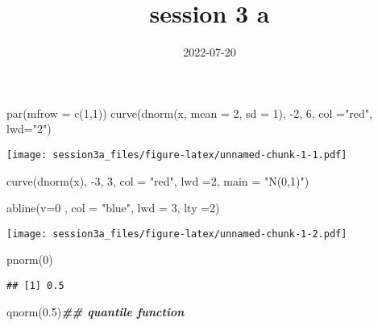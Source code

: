 \documentclass[
]{article}
\title{session 3 a}
\author{}
\date{\vspace{-2.5em}2022-07-20}
\newenvironment{Shaded}{\begin{snugshade}}{\end{snugshade}}
\newcommand{\AttributeTok}[1]{\textcolor[rgb]{0.77,0.63,0.00}{#1}}
\newcommand{\DecValTok}[1]{\textcolor[rgb]{0.00,0.00,0.81}{#1}}
\newcommand{\DocumentationTok}[1]{\textcolor[rgb]{0.56,0.35,0.01}{\textbf{\textit{#1}}}}
\newcommand{\FloatTok}[1]{\textcolor[rgb]{0.00,0.00,0.81}{#1}}
\newcommand{\FunctionTok}[1]{\textcolor[rgb]{0.00,0.00,0.00}{#1}}
\newcommand{\NormalTok}[1]{#1}
\newcommand{\SpecialCharTok}[1]{\textcolor[rgb]{0.00,0.00,0.00}{#1}}
\newcommand{\StringTok}[1]{\textcolor[rgb]{0.31,0.60,0.02}{#1}}
\begin{document}
\maketitle

\begin{Shaded}
\begin{Highlighting}[]
\FunctionTok{par}\NormalTok{(}\AttributeTok{mfrow =} \FunctionTok{c}\NormalTok{(}\DecValTok{1}\NormalTok{,}\DecValTok{1}\NormalTok{))}
\FunctionTok{curve}\NormalTok{(}\FunctionTok{dnorm}\NormalTok{(x, }\AttributeTok{mean =} \DecValTok{2}\NormalTok{, }\AttributeTok{sd =} \DecValTok{1}\NormalTok{), }\SpecialCharTok{{-}}\DecValTok{2}\NormalTok{, }\DecValTok{6}\NormalTok{, }
      \AttributeTok{col =}\StringTok{"red"}\NormalTok{, }\AttributeTok{lwd=}\StringTok{"2"}\NormalTok{)}
\end{Highlighting}
\end{Shaded}

\texttt{[image: session3a\_files/figure-latex/unnamed-chunk-1-1.pdf]}

\begin{Shaded}
\begin{Highlighting}[]
\FunctionTok{curve}\NormalTok{(}\FunctionTok{dnorm}\NormalTok{(x), }\SpecialCharTok{{-}}\DecValTok{3}\NormalTok{, }\DecValTok{3}\NormalTok{, }\AttributeTok{col =} \StringTok{"red"}\NormalTok{, }\AttributeTok{lwd =}\DecValTok{2}\NormalTok{,}
      \AttributeTok{main =} \StringTok{"N(0,1)"}\NormalTok{)}

\FunctionTok{abline}\NormalTok{(}\AttributeTok{v=}\DecValTok{0}\NormalTok{ , }\AttributeTok{col =} \StringTok{"blue"}\NormalTok{, }\AttributeTok{lwd =} \DecValTok{3}\NormalTok{, }\AttributeTok{lty =}\DecValTok{2}\NormalTok{)}
\end{Highlighting}
\end{Shaded}

\texttt{[image: session3a\_files/figure-latex/unnamed-chunk-1-2.pdf]}

\begin{Shaded}
\begin{Highlighting}[]
\FunctionTok{pnorm}\NormalTok{(}\DecValTok{0}\NormalTok{)}
\end{Highlighting}
\end{Shaded}

\begin{verbatim}
## [1] 0.5
\end{verbatim}

\begin{Shaded}
\begin{Highlighting}[]
\FunctionTok{qnorm}\NormalTok{(}\FloatTok{0.5}\NormalTok{)}\DocumentationTok{\#\# quantile function}
\end{Highlighting}
\end{Shaded}
\end{document}
